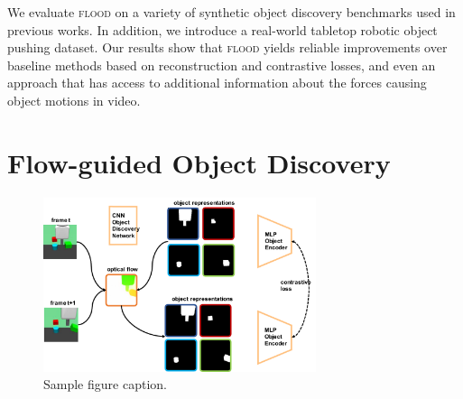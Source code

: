 \documentclass{article}
\begin{document}
We evaluate \textsc{flood} on a variety of synthetic object discovery benchmarks used in previous works. In addition, we introduce a real-world tabletop robotic object pushing dataset. Our results show that \textsc{flood} yields reliable improvements over baseline methods based on reconstruction and contrastive losses, and even an approach that has access to additional information about the forces causing object motions in video.




















\section{Flow-guided Object Discovery}
\label{sec:approach}

\begin{figure}
  \centering
  \includegraphics[width=8cm]{flood-network.pdf}

  \caption{Sample figure caption.}
  \label{fig:architecture}
\end{figure}
\end{document}
